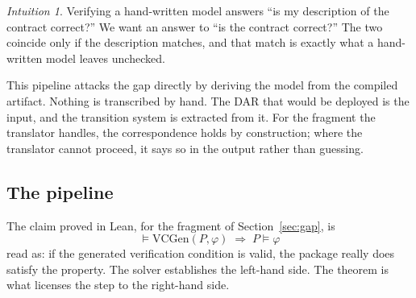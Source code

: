 \documentclass[11pt,a4paper]{article}
\newcommand{\VC}{\mathrm{VCGen}}
\newcommand{\code}[1]{\texttt{#1}}
\theoremstyle{definition}
\theoremstyle{plain}
\theoremstyle{remark}
\newtheorem*{intuition}{Intuition}
\begin{document}
\begin{intuition}
Verifying a hand-written model answers ``is my description of the contract
correct?'' We want an answer to ``is the contract correct?'' The two coincide
only if the description matches, and that match is exactly what a hand-written
model leaves unchecked.
\end{intuition}

This pipeline attacks the gap directly by deriving the model from the compiled
artifact. Nothing is transcribed by hand. The DAR that would be deployed is the
input, and the transition system is extracted from it. For the fragment the
translator handles, the correspondence holds by construction; where the
translator cannot proceed, it says so in the output rather than guessing.

\subsection{The pipeline}

\begin{center}
\end{center}

\noindent
The claim proved in Lean, for the fragment of Section~\ref{sec:gap}, is
\begin{equation}
  \label{eq:central}
  \boxed{\;\models \VC(P, \varphi) \;\Longrightarrow\; P \models \varphi\;}
\end{equation}
read as: if the generated verification condition is valid, the package really
does satisfy the property. The solver establishes the left-hand side. The
theorem is what licenses the step to the right-hand side.
\end{document}
